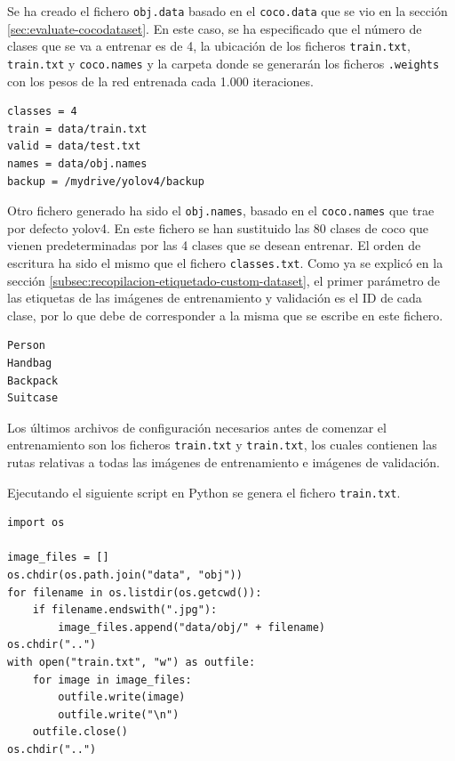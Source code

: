 Se ha creado el fichero \texttt{obj.data} basado en el \texttt{coco.data} que se vio en la sección \ref{sec:evaluate-cocodataset}. En este caso, se ha especificado que el número de clases que se va a entrenar es de 4, la ubicación de los ficheros \texttt{train.txt}, \texttt{train.txt} y \texttt{coco.names} y la carpeta donde se generarán los ficheros \texttt{.weights} con los pesos de la red entrenada cada 1.000 iteraciones.

\vspace{0.5cm}
\begin{lstlisting}[language=iPython,caption=Fichero obj.data,captionpos=b,label={lst:obj-data-file}]
classes = 4
train = data/train.txt
valid = data/test.txt
names = data/obj.names
backup = /mydrive/yolov4/backup
\end{lstlisting}

Otro fichero generado ha sido el \texttt{obj.names}, basado en el \texttt{coco.names} que trae por defecto \gls{yolov4}. En este fichero se han sustituido las 80 clases de \gls{coco} que vienen predeterminadas por las 4 clases que se desean entrenar. El orden de escritura ha sido el mismo que el fichero \texttt{classes.txt}. Como ya se explicó en la sección \ref{subsec:recopilacion-etiquetado-custom-dataset}, el primer parámetro de las etiquetas de las imágenes de entrenamiento y validación es el ID de cada clase, por lo que debe de corresponder a la misma que se escribe en este fichero.

\vspace{0.5cm}
\begin{lstlisting}[language=iPython,caption=Fichero obj.names,captionpos=b,label={lst:obj-names-file}]
Person
Handbag
Backpack
Suitcase
\end{lstlisting}

Los últimos archivos de configuración necesarios antes de comenzar el entrenamiento son los ficheros \texttt{train.txt} y \texttt{train.txt}, los cuales contienen las rutas relativas a todas las imágenes de entrenamiento e imágenes de validación.

Ejecutando el siguiente script en Python se genera el fichero \texttt{train.txt}.

\vspace{0.5cm}
\begin{lstlisting}[language=iPython,caption=Generación del fichero train.txt,captionpos=b,label={lst:train-generate}]
import os

image_files = []
os.chdir(os.path.join("data", "obj"))
for filename in os.listdir(os.getcwd()):
    if filename.endswith(".jpg"):
        image_files.append("data/obj/" + filename)
os.chdir("..")
with open("train.txt", "w") as outfile:
    for image in image_files:
        outfile.write(image)
        outfile.write("\n")
    outfile.close()
os.chdir("..")
\end{lstlisting}

